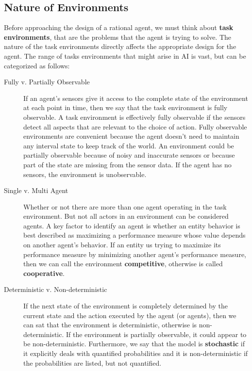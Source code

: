 \documentclass{article}
\begin{document}
\subsection{Nature of Environments}
Before approaching the design of a rational agent, we must think about \textbf{task environments}, that are the problems that the agent is trying to solve. The nature of the task environments directly affects the appropriate design for the agent. The range of tasks environments that might arise in AI is vast, but can be categorized as follows:
\begin{description}
    \item[Fully v. Partially Observable] If an agent's sensors give it access to the complete state of the environment at each point in time, then we say that the task environment is fully observable.
    A task environment is effectively fully observable if the sensors detect all aspects that are relevant to the choice of action. 
    Fully observable environments are convenient because the agent doesn't need to maintain any interval state to keep track of the world.
    An environment could be partially observable because of noisy and inaccurate sensors or because part of the state are missing from the sensor data. If the agent has no sensors, the environment is unobservable.

    \item[Single v. Multi Agent] Whether or not there are more than one agent operating in the task environment. But not all actors in an environment can be considered agents. A key factor to identify an agent is whether an entity behavior is best described as maximizing a performance measure whose value depends on another agent's behavior. 
    If an entity us trying to maximize its performance measure by minimizing another agent's performance measure, then we can call the environment \textbf{competitive}, otherwise is called \textbf{cooperative}.

    \item[Deterministic v. Non-deterministic] If the next state of the environment is completely determined by the current state and the action executed by the agent (or agents), then we can sat that the environment is deterministic, otherwise is non-deterministic.
    If the environment is partially observable, it could appear to be non-deterministic. Furthermore, we say that the model is \textbf{stochastic} if it explicitly deals with quantified probabilities and it is non-deterministic if the probabilities are listed, but not quantified.


\end{description}
\end{document}
